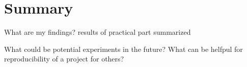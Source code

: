 \chapter{Summary}


What are my findings? results of practical part summarized



What could be potential experiments in the future?
What can be helfpul for reproducibility of a project for others?

